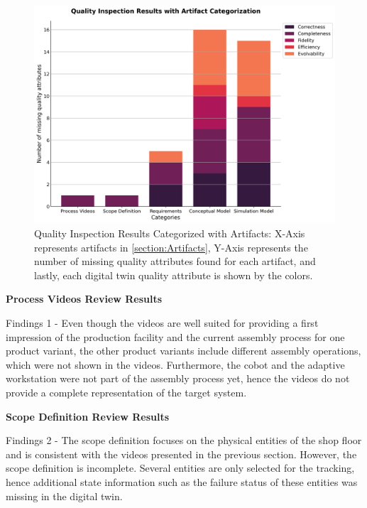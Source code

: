 \documentclass{llncs}
\begin{document}
    \begin{figure}[htbp]
        \includegraphics[scale = 0.40]{quality_inspection_results_with_artifacts.png}
        \caption{Quality Inspection Results Categorized with Artifacts: X-Axis represents artifacts in \ref{section:Artifacts}, Y-Axis represents the number of missing quality attributes found for each artifact, 
        and lastly, each digital twin quality attribute is shown by the colors.}
        \label{fig:QualityInspectonResultsWithArtifacts}
    \end{figure}

    \textbf{Process Videos Review Results}

    Findings 1  - Even though the videos are well suited for providing a first impression of the production facility 
    and the current assembly process for one product variant, the other product variants include different assembly operations, 
    which were not shown in the videos. 
    Furthermore, the cobot and the adaptive workstation were not part of the assembly process yet,
     hence the videos do not provide a complete representation of the target system.  

    \textbf{Scope Definition Review Results}

    Findings 2 - The scope definition focuses on the physical entities of the shop floor and is consistent with the videos presented in the previous section. 
    However, the scope definition is incomplete. Several entities are only selected for the tracking, hence additional state information such as the failure status of these entities was missing in the digital twin. 
\end{document}
